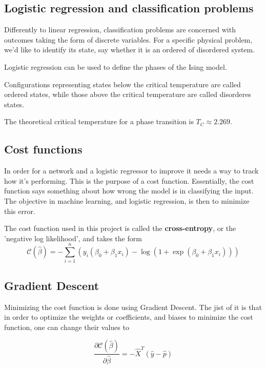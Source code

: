 \subsection{Logistic regression and classification problems}\label{seq:logistic}
Differently to linear regression, classification problems 
are concerned with outcomes taking the form of discrete variables. 
For a specific physical problem, we'd like to identify its state, say whether
it is an ordered of disordered system. ~\cite{LectureNotes-FysStk}

Logistic regression can be used to define the phases of the Ising
model.~\cite{LectureNotes} 

Configurations representing states below the critical temperature are called
ordered states, while those above the critical temperature are called 
disorderes states. ~\cite{Project2} 

The theoretical critical temperature for a phase transition is 
\(T_C \approx 2.269\). 

\subsection{Cost functions}\label{seq:cost}  
In order for a network and a logistic regressor to improve it needs a way to 
track how it's performing. This is the purpose of a cost function. Essentially,
the cost function says something about how wrong the model is in classifying the
input. The objective in machine learning, and logistic regression, is then to minimize
this error.

The cost function used in this project is called the \textbf{cross-entropy}, or the
'negative log likelihood', and takes the form
\begin{equation}\label{eq:cross-entropy}
	\mathcal{C}(\hat{\beta})=-\sum_{i=1}^n  \left(y_i(\beta_0+\beta_1x_i) -\log{(1+\exp{(\beta_0+\beta_1x_i)})}\right)
\end{equation}

\subsection{Gradient Descent}\label{seq:gradient}
Minimizing the cost function is done using Gradient Descent.
The jist of it is that in order to optimize the weights or coefficients, 
and biases to minimize the cost function, one can change their values to 

\begin{equation}\label{eq:delta-c}
	\frac{\partial \mathcal{C}(\hat{\beta})}{\partial \hat{\beta}} = -\hat{X}^T\left(\hat{y}-\hat{p}\right)
\end{equation}

